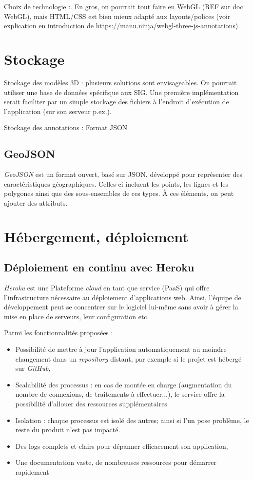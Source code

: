 Choix de technologie :. En gros, on pourrait tout faire en WebGL (REF sur doc WebGL), mais HTML/CSS est bien mieux adapté aux layouts/polices (voir explication en introduction de https://manu.ninja/webgl-three-js-annotations).

\section{Stockage}
Stockage des modèles 3D :
plusieurs solutions sont envisageables. On pourrait utiliser une base de données spécifique aux SIG.
Une première implémentation serait faciliter par un simple stockage des fichiers à l'endroit d'exécution de l'application (sur son serveur p.ex.).


Stockage des annotations :
Format JSON

\subsection{GeoJSON}
\textit{GeoJSON} est un format ouvert,  basé sur JSON, développé pour représenter des caractéristiques géographiques.
Celles-ci incluent les points, les lignes et les polygones ainsi que des sous-ensembles de ces types. À ces éléments, on peut ajouter des attributs.



\section{Hébergement, déploiement}

\subsection{Déploiement en continu avec Heroku}

\textit{Heroku} est une Plateforme \textit{cloud} en tant que service (PaaS) qui offre l'infrastructure nécessaire au déploiement d'applications web. Ainsi, l'équipe de développement peut se concentrer sur le logiciel lui-même sans avoir à gérer la mise en place de serveurs, leur configuration etc.

Parmi les fonctionnalités proposées :
\begin{itemize}
    \item Possibilité de mettre à jour l'application automatiquement au moindre changement dans un \textit{repository} distant, par exemple si le projet est hébergé sur \textit{GitHub},
    \item Scalabilité des processus : en cas de montée en charge (augmentation du nombre de connexions, de traitements à effectuer...), le service offre la possibilité d'allouer des ressources supplémentaires
    \item Isolation : chaque processus est isolé des autres; ainsi si l'un pose problème, le reste du produit n'est pas impacté.
    \item Des logs complets et clairs pour dépanner efficacement son application,
    \item Une documentation vaste, de nombreuses ressources pour démarrer rapidement
\end{itemize}

